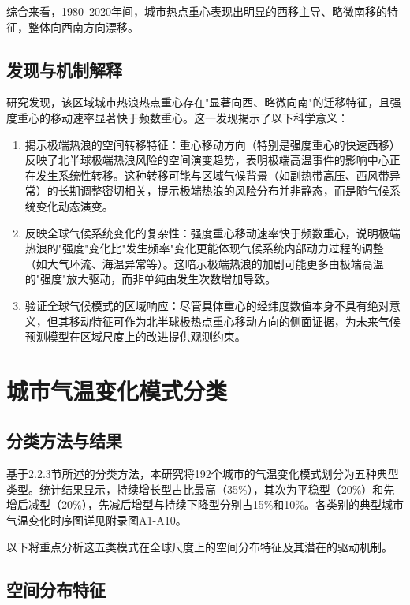 \documentclass[a4paper,UTF8,scheme=chinese,zihao=-4,twoside]{ctexart}
\makeatletter
\newcommand{\初号}{\zihao{0}}
\newcommand{\小初}{\zihao{-0}}
\newcommand{\一号}{\zihao{1}}
\newcommand{\小一}{\zihao{-1}}
\newcommand{\二号}{\zihao{2}}
\newcommand{\小二}{\zihao{-2}}
\newcommand{\三号}{\zihao{3}}
\newcommand{\小三}{\zihao{-3}}
\newcommand{\四号}{\zihao{4}}
\newcommand{\小四}{\zihao{-4}}
\newcommand{\五号}{\zihao{5}}
\newcommand{\小五}{\zihao{-5}}
\newcommand{\六号}{\zihao{6}}
\newcommand{\小六}{\zihao{-6}}
\newcommand{\七号}{\zihao{7}}
\newcommand{\八号}{\zihao{8}}
\newcommand{\宋体}{\songti}
\newcommand{\黑体}{\heiti}
\newcommand{\仿宋}{\fangsong}
\newcommand{\楷书}{\kaishu}
\newcommand{\粗体}{\bfseries}
\newcommand{\斜体}{\itshape}
\newcommand\下划线[2][6em]{\hskip1pt\underline{\hb@xt@ #1{\hss#2\hss}}\hskip3pt}
\makeatother
\begin{document}
综合来看，1980–2020年间，城市热点重心表现出明显的西移主导、略微南移的特征，整体向西南方向漂移。

\subsection{发现与机制解释}

研究发现，该区域城市热浪热点重心存在"显著向西、略微向南"的迁移特征，且强度重心的移动速率显著快于频数重心。这一发现揭示了以下科学意义：

\begin{enumerate}
    \item 揭示极端热浪的空间转移特征：重心移动方向（特别是强度重心的快速西移）反映了北半球极端热浪风险的空间演变趋势，表明极端高温事件的影响中心正在发生系统性转移。这种转移可能与区域气候背景（如副热带高压、西风带异常）的长期调整密切相关，提示极端热浪的风险分布并非静态，而是随气候系统变化动态演变。
    \item 反映全球气候系统变化的复杂性：强度重心移动速率快于频数重心，说明极端热浪的"强度"变化比"发生频率"变化更能体现气候系统内部动力过程的调整（如大气环流、海温异常等）。这暗示极端热浪的加剧可能更多由极端高温的"强度"放大驱动，而非单纯由发生次数增加导致。
    \item 验证全球气候模式的区域响应：尽管具体重心的经纬度数值本身不具有绝对意义，但其移动特征可作为北半球极热点重心移动方向的侧面证据，为未来气候预测模型在区域尺度上的改进提供观测约束。
\end{enumerate}

\section{城市气温变化模式分类}

\subsection{分类方法与结果}

基于2.2.3节所述的分类方法，本研究将192个城市的气温变化模式划分为五种典型类型。统计结果显示，持续增长型占比最高（35\%），其次为平稳型（20\%）和先增后减型（20\%），先减后增型与持续下降型分别占15\%和10\%。各类别的典型城市气温变化时序图详见附录图A1-A10。

以下将重点分析这五类模式在全球尺度上的空间分布特征及其潜在的驱动机制。

\subsection{空间分布特征}
\end{document}
